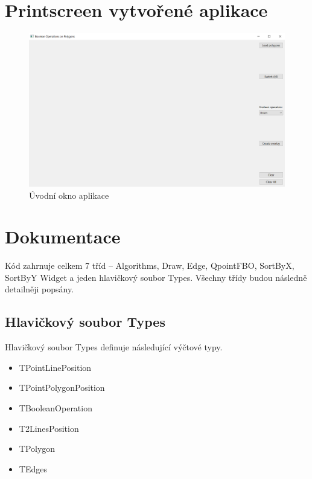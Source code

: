 \documentclass[11pt]{article}
\begin{document}
\section{Printscreen vytvořené aplikace}
\begin{figure}[htbh]
	\centering
	
	\includegraphics[scale=0.42]{images/aplikace_uvodni_okno.png} 
	\caption{Úvodní okno aplikace}
	\label{fig:uvodni_okno}
\end{figure} 
\FloatBarrier

\clearpage


\section{Dokumentace}
Kód zahrnuje celkem 7 tříd – Algorithms, Draw, Edge, QpointFBO, SortByX, SortByY Widget a jeden hlavičkový soubor Types. Všechny třídy budou následně detailněji popsány.   

\subsection{Hlavičkový soubor Types}
Hlavičkový soubor Types definuje následující výčtové typy.

\begin{itemize}
\item TPointLinePosition
\item TPointPolygonPosition
\item TBooleanOperation
\item T2LinesPosition
\item TPolygon
\item TEdges
\end{itemize}
\end{document}

